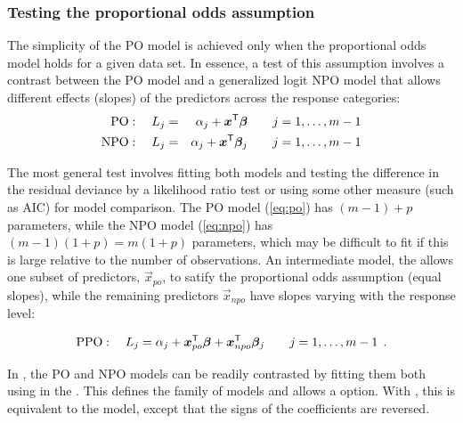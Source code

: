 \documentclass[11pt]{book}\usepackage[]{graphicx}\usepackage[]{color}
\begin{document}
\subsubsection{Testing the proportional odds assumption}
The simplicity of the PO model is achieved only when the proportional odds model holds
for a given data set.  In essence, a test of this assumption involves a contrast between
the PO model and a generalized logit NPO model that allows different effects (slopes)
of the predictors across the response categories:
\begin{eqnarray}
  \mathrm{PO}: \quad
    L_j &=& \alpha_j + \bm{x}^\mathsf{T} \bm{\beta} \quad\quad j=1, \dots , m-1 \label{eq:po} \\
  \mathrm{NPO}: \quad
    L_j &=& \alpha_j + \bm{x}^\mathsf{T} \bm{\beta}_j \quad\quad j=1, \dots , m-1 \label{eq:npo} 
\end{eqnarray}

The most general test involves fitting both models and testing the difference in the
residual deviance by a likelihood ratio test
or using some other measure (such as AIC) for model comparison. 
The PO model (\eqref{eq:po}) has $(m-1) + p$ parameters, while the NPO model
(\eqref{eq:npo}) has $(m-1) (1+p) = m(1+p)$ parameters, which may be difficult to
fit if this is large relative to the number of observations.
An intermediate model, the 
\citep{PetersonHarrell:90} allows one subset of predictors, $\vec{x}_{po}$,
to satify the proportional odds assumption (equal slopes), while the
remaining predictors $\vec{x}_{npo}$ have slopes varying with the response level:

\begin{equation}\label{eq:ppo}
   \mathrm{PPO}: \quad
  L_j = \alpha_j + \bm{x}_{po}^\mathsf{T} \bm{\beta} + \bm{x}_{npo}^\mathsf{T} \bm{\beta}_j \quad\quad j=1, \dots , m-1 \:\: .
\end{equation}

In \R, the PO and NPO models can be readily contrasted by fitting them both using
 in the .  This defines the  
family of models and allows a  option.
With , this is equivalent to the  model,
except that the signs of the coefficients are reversed.
\end{document}
